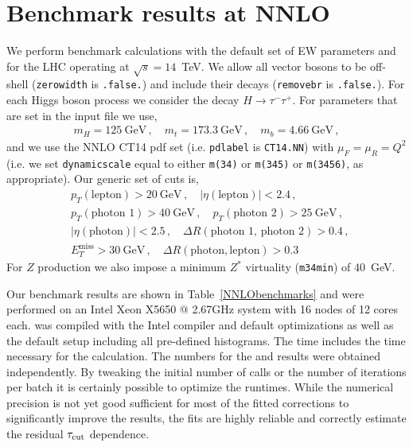
\section{Benchmark results at NNLO }
\label{sec:NNLO}
\label{sec:benchmark}
We perform benchmark calculations with the default set of EW parameters
and for the LHC operating at $\sqrt s = 14$~TeV.  We allow all
vector bosons to be off-shell ({\tt zerowidth} is {\tt .false.})
and include their decays ({\tt removebr} is {\tt .false.}).
For each Higgs boson process we consider the decay $H \to \tau^- \tau^+$.
For parameters that are set in the input file we use,
\begin{eqnarray}
m_H = 125~\mbox{GeV} \,, \quad
m_t = 173.3~\mbox{GeV} \,, \quad 
m_b = 4.66~\mbox{GeV} \,, 
\end{eqnarray}
and we use the NNLO CT14 pdf set (i.e. {\tt pdlabel} is {\tt CT14.NN}) with
$\mu_F = \mu_R = Q^2$ (i.e. we set {\tt dynamicscale} equal to
either {\tt m(34)} or {\tt m(345)} or {\tt m(3456)}, as appropriate).
Our generic set of cuts is,
\begin{eqnarray}
&& p_T(\mbox{lepton}) > 20~\mbox{GeV} \,, \quad
|\eta(\mbox{lepton})| < 2.4 \,, \quad \nonumber \\
&& p_T(\mbox{photon 1}) > 40~\mbox{GeV} \,, \quad
   p_T(\mbox{photon 2}) > 25~\mbox{GeV} \,, \quad \nonumber \\
&&|\eta(\mbox{photon})| < 2.5 \,, \quad 
\Delta R(\mbox{photon 1, photon 2}) > 0.4 \,, \quad \nonumber \\
&& E_T^{\mbox{miss}} > 30~\mbox{GeV} \,, \quad \Delta R(\text{photon}, \text{lepton}) > 0.3 \quad
\end{eqnarray}
For $Z$ production we also impose a minimum $Z^*$ virtuality ({\tt m34min})
of $40$~GeV.

Our benchmark results are shown in Table~\ref{NNLObenchmarks} and were performed on an Intel Xeon X5650 @ 2.67GHz
system with 16 nodes of 12 cores each. \MCFM{} was compiled with the Intel compiler and default optimizations as well
as the default \MCFM{} setup including all pre-defined histograms.  The \NNLO{} \CPU{} time includes the time necessary 
for the \NLO{} calculation. The numbers for the \NLO{} and \NNLO{} results were obtained independently. By tweaking the 
initial number of calls or the number of iterations per batch it is 
certainly possible to optimize the runtimes. While the numerical precision is not yet good sufficient for most of the 
fitted corrections to significantly improve the results, the fits are highly reliable and correctly estimate the 
residual $\tau_\text{cut}$ dependence.

